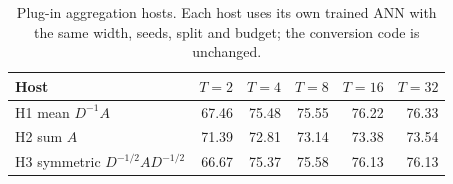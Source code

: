 \begin{table}[t]
\centering
\small
\caption{Plug-in aggregation hosts. Each host uses its own trained ANN with the
same width, seeds, split and budget; the conversion code is unchanged.}
\label{tab:hosts}
\begin{tabular}{lrrrrr}
\toprule
Host & $T{=}2$ & $T{=}4$ & $T{=}8$ & $T{=}16$ & $T{=}32$ \\
\midrule
H1 mean $D^{-1}A$ & 67.46 & 75.48 & 75.55 & 76.22 & 76.33 \\
H2 sum $A$ & 71.39 & 72.81 & 73.14 & 73.38 & 73.54 \\
H3 symmetric $D^{-1/2}AD^{-1/2}$ & 66.67 & 75.37 & 75.58 & 76.13 & 76.13 \\
\bottomrule
\end{tabular}
\end{table}
